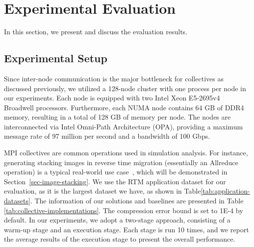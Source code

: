 \section{Experimental Evaluation}\label{exp-setup-sec}

In this section, we present and discuss the evaluation results.



\subsection{Experimental Setup}
\label{sec:setup}

Since inter-node communication is the major bottleneck for collectives as discussed previously, we utilized a 128-node cluster with one process per node in our experiments. Each node is equipped with two Intel Xeon E5-2695v4 Broadwell processors. Furthermore, each NUMA node contains 64 GB of DDR4 memory, resulting in a total of 128 GB of memory per node. The nodes are interconnected via Intel Omni-Path Architecture (OPA), providing a maximum message rate of 97 million per second and a bandwidth of 100 Gbps.



\begin{table}[h]
\centering
\caption{Information of the application datasets.}
\label{tab:application-datasets}
\end{table}



MPI collectives are common operations used in simulation analysis. For instance, generating stacking images in reverse time migration (essentially an Allreduce operation) is a typical real-world use case~\cite{Gurhem2021Kirchhoff}, which will be demonstrated in Section~\ref{sec-image-stacking}. We use the RTM application dataset for our evaluation, as it is the largest dataset we have, as shown in Table\ref{tab:application-datasets}. The information of our solutions and baselines are presented in Table \ref{tab:collective-implementations}. The compression error bound is set to 1E-4 by default. In our experiments, we adopt a two-stage approach, consisting of a warm-up stage and an execution stage. Each stage is run 10 times, and we report the average results of the execution stage to present the overall performance.

